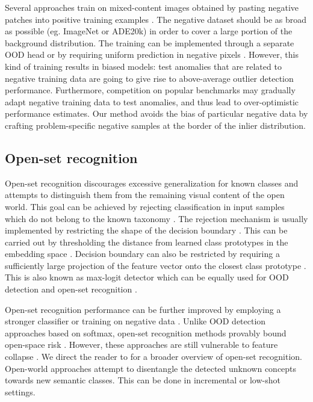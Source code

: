 \documentclass[lettersize,journal,hidelinks]{IEEEtran}
\begin{document}
Several approaches train on mixed-content images
obtained by pasting negative patches into positive training examples \cite{bevandic19gcpr,biase21cvpr,chan21iccv}.
The negative dataset should be as broad as possible (eg. ImageNet or ADE20k) in order to cover a large portion of the background distribution.
The training can be implemented through a separate OOD head \cite{bevandic19gcpr} or by requiring uniform prediction in negative pixels \cite{chan21iccv}.
However, this kind of training results in biased models: test anomalies that are related to negative training data are going to give rise to above-average outlier detection performance.
Furthermore, competition on popular benchmarks may gradually adapt negative training data to test anomalies, and thus lead to over-optimistic performance estimates.
Our method avoids the bias of particular negative data
by crafting problem-specific negative samples
at the border of the inlier distribution.

\subsection{Open-set recognition}
\label{sec:osr}

Open-set recognition \cite{scheirer12tpami} discourages excessive generalization 
for known classes and attempts to distinguish them 
from the remaining visual content of the open world.
This goal can be achieved by rejecting classification in input samples which do not belong to the known taxonomy \cite{scheirer12tpami,bendale16cvpr,zhang20eccv,oliveira21ml}.
The rejection mechanism is usually implemented by restricting the shape of the decision boundary \cite{scheirer14tpami}.
This can be carried out by thresholding
the distance from learned class prototypes in the embedding
space \cite{cen21iccv,chen22tpami}.
Decision boundary can also be restricted by requiring a sufficiently large projection of the feature vector onto the closest class prototype \cite{hendrycks19arxiv}.
This is also known as max-logit detector which can be equally used for OOD detection and open-set recognition \cite{hendrycks19arxiv,vaze22iclr}.

Open-set recognition performance can be further improved by employing a stronger classifier \cite{vaze22iclr} or training on negative data \cite{neal18eccv,kong22tpami}.
Unlike OOD detection approaches based on softmax, open-set recognition methods provably bound open-space risk \cite{scheirer12tpami,boult19aaai}.
However, these approaches are still vulnerable to feature collapse \cite{amersfoort21arxiv}.
We direct the reader to \cite{geng21tpami,brilhadoz21} for a broader overview of open-set recognition.
Open-world approaches attempt to disentangle the detected unknown concepts towards new semantic classes.
This can be done in incremental \cite{michieli21cviu,uhlemeyer22uai} or low-shot \cite{yu18tnnls,shaban17bmvc,lu21tnnls} settings. 
\end{document}
